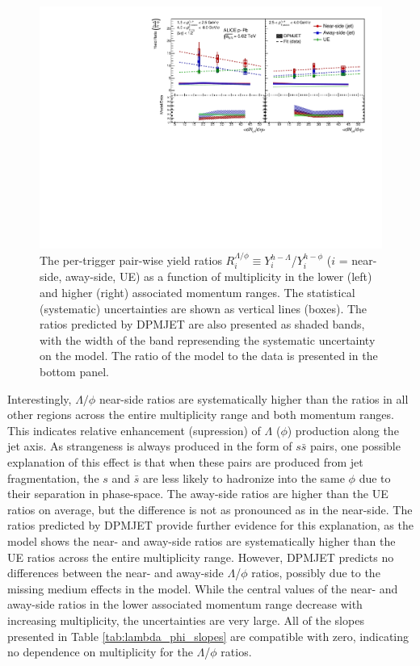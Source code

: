 \begin{figure}[h!]
\centering
\includegraphics[width=\textwidth]{figures/results/final_lambda_phi_ratio_plot_new_x_axis_model_ratio.pdf}
\caption{The per-trigger pair-wise yield ratios $R_{i}^{\Lambda/\phi} \equiv Y_{i}^{h-\Lambda}$/$Y_{i}^{h-\phi}$ ($i$ = near-side, away-side, UE) as a function of multiplicity in the lower (left) and higher (right) associated momentum ranges. The statistical (systematic) uncertainties are shown as vertical lines (boxes).  The ratios predicted by DPMJET are also presented as shaded bands, with the width of the band represending the systematic uncertainty on the model. The ratio of the model to the data is presented in the bottom panel.}
\label{fig:lambda_phi_ratio}
\end{figure}

Interestingly, $\Lambda/\phi$ near-side ratios are systematically higher than the ratios in all other regions across the entire multiplicity range and both momentum ranges. This indicates relative enhancement (supression) of $\Lambda$ ($\phi$) production along the jet axis. As strangeness is always produced in the form of $s\bar{s}$ pairs, one possible explanation of this effect is that when these pairs are produced from jet fragmentation, the $s$ and $\bar{s}$ are less likely to hadronize into the same $\phi$ due to their separation in phase-space. The away-side ratios are higher than the UE ratios on average, but the difference is not as pronounced as in the near-side.  The ratios predicted by DPMJET provide further evidence for this explanation, as the model shows the near- and away-side ratios are systematically higher than the UE ratios across the entire multiplicity range. However, DPMJET predicts no differences between the near- and away-side $\Lambda$/$\phi$ ratios, possibly due to the missing medium effects in the model. While the central values of the near- and away-side ratios in the lower associated momentum range decrease with increasing multiplicity, the uncertainties are very large. All of the slopes presented in Table \ref{tab:lambda_phi_slopes} are compatible with zero, indicating no dependence on multiplicity for the $\Lambda$/$\phi$ ratios.

